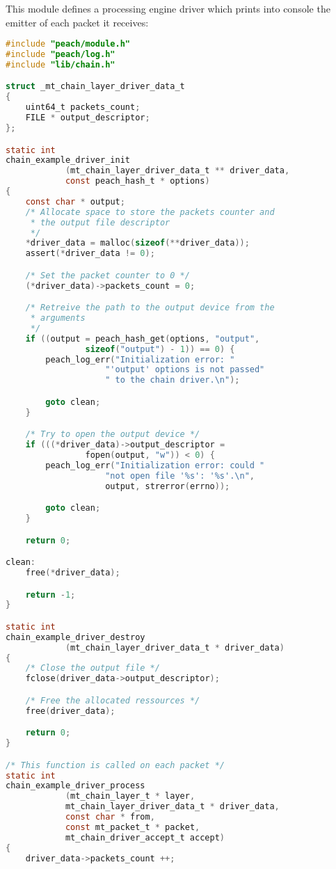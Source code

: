 This module defines a processing engine driver which prints into console the 
emitter of each packet it receives:
\begin{lstlisting}[language=C,
caption=Complete Processing engine \& Module example]
#include "peach/module.h"
#include "peach/log.h"
#include "lib/chain.h"

struct _mt_chain_layer_driver_data_t
{
    uint64_t packets_count;
    FILE * output_descriptor;
};

static int 
chain_example_driver_init
            (mt_chain_layer_driver_data_t ** driver_data, 
            const peach_hash_t * options)
{
    const char * output;
    /* Allocate space to store the packets counter and
     * the output file descriptor 
     */
    *driver_data = malloc(sizeof(**driver_data));
    assert(*driver_data != 0);

    /* Set the packet counter to 0 */
    (*driver_data)->packets_count = 0;

    /* Retreive the path to the output device from the 
     * arguments 
     */
    if ((output = peach_hash_get(options, "output", 
                sizeof("output") - 1)) == 0) {
        peach_log_err("Initialization error: "
                    "'output' options is not passed"
                    " to the chain driver.\n");

        goto clean;
    }

    /* Try to open the output device */
    if (((*driver_data)->output_descriptor = 
                fopen(output, "w")) < 0) {
        peach_log_err("Initialization error: could "
                    "not open file '%s': '%s'.\n", 
                    output, strerror(errno));

        goto clean;
    }

    return 0;

clean:
    free(*driver_data);

    return -1;
}

static int 
chain_example_driver_destroy
            (mt_chain_layer_driver_data_t * driver_data)
{
    /* Close the output file */
    fclose(driver_data->output_descriptor);

    /* Free the allocated ressources */
    free(driver_data);

    return 0;
}

/* This function is called on each packet */
static int
chain_example_driver_process
            (mt_chain_layer_t * layer,
            mt_chain_layer_driver_data_t * driver_data,
            const char * from,
            const mt_packet_t * packet,
            mt_chain_driver_accept_t accept)
{
    driver_data->packets_count ++;


\end{lstlisting}

